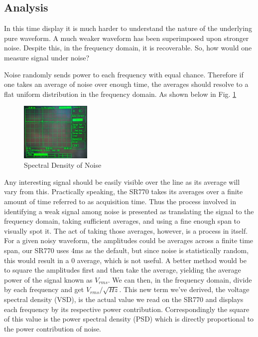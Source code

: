 \documentclass[prl,twocolumn,superscriptaddress,floatfix]{revtex4}
\begin{document}
\subsection{Analysis}
In this time display it is much harder to understand the nature of the underlying pure waveform.
A much weaker waveform has been superimposed upon stronger noise.
Despite this, in the frequency domain, it is recoverable. So, how would one measure signal under noise?

Noise randomly sends power to each frequency with equal chance.
Therefore if one takes an average of noise over enough time, the averages should resolve to a flat uniform distribution in the frequency domain. As shown below in Fig. \ref{fig:averaged noise}

 \begin{figure}[H]
    \centering
    \includegraphics[width=0.3\textwidth]{Averaged Noise.jpg}
    \caption{Spectral Density of Noise}
    \label{fig:averaged noise}
 \end{figure}

Any interesting signal should be easily visible over the line as its average will vary from this.
Practically speaking, the SR770 takes its averages over a finite amount of time referred to as acquisition time.
Thus the process involved in identifying a weak signal among noise is presented as translating the signal to the frequency domain, taking sufficient averages, and using a fine enough span to visually spot it.
The act of taking those averages, however, is a process in itself. For a given noisy waveform, the amplitudes could be averages across a finite time span, our SR770 uses 4ms as the default, but since noise is statistically random, this would result in a 0 average, which is not useful. 
A better method would be to square the amplitudes first and then take the average, yielding the average power of the signal known as $V_{rms}$. 
We can then, in the frequency domain, divide by each frequency and get $V_{rms}/\sqrt{Hz}$. 
This new term we've derived, the voltage spectral density (VSD), is the actual value we read on the SR770 and displays each frequency by its respective power contribution. Correspondingly the square of this value is the power spectral density (PSD) which is directly proportional to the power contribution of noise.
\end{document}

